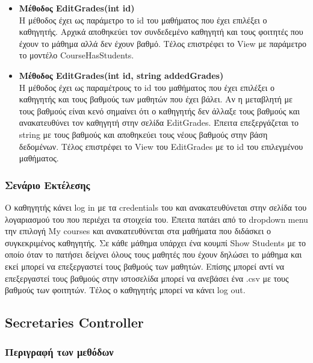 \documentclass[12pt]{article}
\begin{document}
\begin{itemize}
		\item \textbf{Μέθοδος EditGrades(int id)}\\
		Η μέθοδος έχει ως παράμετρο το id του μαθήματος που έχει επιλέξει ο καθηγητής. Αρχικά αποθηκεύει τον συνδεδεμένο καθηγητή και τους φοιτητές που έχουν το μάθημα αλλά δεν έχουν βαθμό. Τέλος επιστρέφει το View με παράμετρο το μοντέλο CourseHasStudents.		
		
		\item \textbf{Μέθοδος EditGrades(int id, string addedGrades)}\\
		Η μέθοδος έχει ως παραμέτρους το id  του μαθήματος που έχει επιλέξει ο καθηγητής και τους βαθμούς των μαθητών που έχει βάλει. Αν η μεταβλητή με τους βαθμούς είναι κενό σημαίνει ότι ο καθηγητής δεν άλλαξε τους βαθμούς και ανακατευθύνει τον καθηγητή στην σελίδα EditGrades. Έπειτα επεξεργάζεται το string με τους βαθμούς και αποθηκεύει τους νέους βαθμούς στην βάση δεδομένων. Τέλος επιστρέφει το View του EditGrades με το id του επιλεγμένου μαθήματος.		
					
	\end{itemize}
	
	\subsubsection{Σενάριο Εκτέλεσης}
	Ο καθηγητής κάνει log in με τα credentials του και ανακατευθύνεται στην σελίδα του λογαριασμού του που περιέχει τα στοιχεία του. Έπειτα πατάει από το dropdown menu την επιλογή My courses και ανακατευθύνεται στα μαθήματα που διδάσκει ο συγκεκριμένος καθηγητής. Σε κάθε μάθημα υπάρχει ένα κουμπί Show Students με το οποίο όταν το πατήσει δείχνει όλους τους μαθητές που έχουν δηλώσει το μάθημα και εκεί μπορεί να επεξεργαστεί τους βαθμούς των μαθητών. Επίσης μπορεί αντί να επεξεργαστεί τους βαθμούς στην ιστοσελίδα μπορεί να ανεβάσει ένα .csv με τους βαθμούς των φοιτητών. Τέλος ο καθηγητής μπορεί να κάνει log out.
	
	\subsection{Secretaries Controller}
	
	\subsubsection{Περιγραφή των μεθόδων}
	
\end{document}
